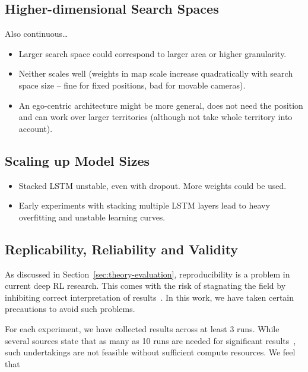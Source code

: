\subsection{Higher-dimensional Search Spaces}

Also continuous\dots

\begin{itemize}
    \item Larger search space could correspond to larger area or higher granularity.
    \item Neither scales well (weights in map scale increase quadratically with search space size -- fine for fixed positions, bad for movable cameras).
    \item An ego-centric architecture might be more general, does not need the position and can work over larger territories (although not take whole territory into account).
\end{itemize}


\subsection{Scaling up Model Sizes}

\begin{itemize}
    \item Stacked LSTM unstable, even with dropout. More weights could be used.
    \item Early experiments with stacking multiple LSTM layers lead to heavy overfitting and unstable learning curves.
\end{itemize}

\subsection{Replicability, Reliability and Validity}

As discussed in Section~\ref{sec:theory-evaluation}, reproducibility is a problem in current deep RL research.
This comes with the risk of stagnating the field by inhibiting correct interpretation of results~\cite{henderson_matters_2018}.
In this work, we have taken certain precautions to avoid such problems.

For each experiment, we have collected results across at least 3 runs.
While several sources state that as many as 10 runs are needed for significant results~\cite{colas_hitchhiker_2019,agarwal_rlliable_2022},
such undertakings are not feasible without sufficient compute resources.
We feel that 

